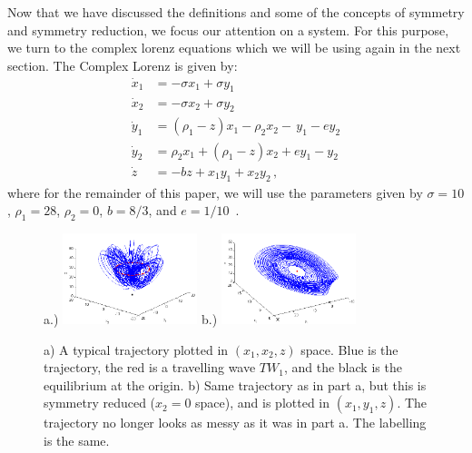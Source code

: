 \documentclass[12 pt]{article}
\begin{document}
Now that we have discussed the definitions and some of the concepts of
symmetry and symmetry reduction, we focus our attention on a system.  For
this purpose, we turn to the complex lorenz equations which we will be
using again in the next section. The Complex Lorenz is given by:
\begin{equation}
\begin{split}
  \dot x_1 &= -\sigma x_1  + \sigma y_1 \\
  \dot x_2 &=  -\sigma x_2  + \sigma y_2 \\
  \dot y_1 &= (\rho_1  -  z)x_1  -  \rho_2x_2  - \, y_1  - ey_2 \\
  \dot y_2 &= \rho_2x_1  +  (\rho_1  -  z)x_2  +  ey_1  -  y_2 \\
  \dot z &= -bz  + x_1y_1+x_2y_2 \,,
  \label{eq:CLE}
\end{split}
\end{equation}
where for the remainder of this paper, we will use the parameters given
by $\sigma = 10$, $\rho_1 = 28$, $\rho_2 = 0$, $b = 8/3$, and $e =
1/10$~\cite{Eth}.
\begin{figure}[h]
\centering
a.)  \includegraphics[width=0.35\textwidth]{Figs/Section2/kcCLEaxisonc.png}
b.)
  \includegraphics[width=0.35\textwidth]{Figs/Section2/kcCLEredaxisonc.png}
\caption{
a) A typical trajectory plotted in $(x_1, x_2, z)$ space.  Blue is the
trajectory, the red is a travelling wave $TW_1$, and the black is the
equilibrium at the origin.
b) Same trajectory as in part a, but this is symmetry reduced ($x_2 = 0$
space), and is plotted in $(x_1, y_1, z)$.  The trajectory no longer
looks as messy as it was in part a.  The labelling is the same.
}
 \label{fig:CLETraj}
\end{figure}
\end{document}
